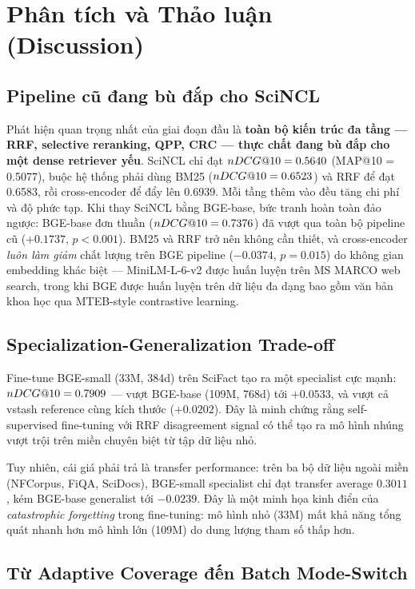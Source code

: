 \section{Phân tích và Thảo luận (Discussion)}
\label{sec:discussion}

\subsection{Pipeline cũ đang bù đắp cho SciNCL}

Phát hiện quan trọng nhất của giai đoạn đầu là \textbf{toàn bộ kiến trúc đa tầng --- RRF, selective
reranking, QPP, CRC --- thực chất đang bù đắp cho một dense retriever yếu}. SciNCL chỉ đạt $nDCG@10 = 0.5640$
(MAP@10 = 0.5077), buộc hệ thống phải dùng BM25 ($nDCG@10 = 0.6523$) và RRF để đạt 0.6583, rồi
cross-encoder để đẩy lên 0.6939. Mỗi tầng thêm vào đều tăng chi phí và độ phức tạp. Khi thay SciNCL bằng
BGE-base, bức tranh hoàn toàn đảo ngược: BGE-base đơn thuần ($nDCG@10 = 0.7376$) đã vượt qua toàn bộ
pipeline cũ ($+0.1737$, $p<0.001$). BM25 và RRF trở nên không cần thiết, và cross-encoder \emph{luôn
làm giảm} chất lượng trên BGE pipeline ($-0.0374$, $p=0.015$) do không gian embedding khác biệt ---
MiniLM-L-6-v2 được huấn luyện trên MS MARCO web search, trong khi BGE được huấn luyện trên dữ liệu
đa dạng bao gồm văn bản khoa học qua MTEB-style contrastive learning.

\subsection{Specialization-Generalization Trade-off}

Fine-tune BGE-small (33M, 384d) trên SciFact tạo ra một specialist cực mạnh: $nDCG@10 = 0.7909$ --- vượt
BGE-base (109M, 768d) tới $+0.0533$, và vượt cả vstash reference cùng kích thước ($+0.0202$). Đây là
minh chứng rằng self-supervised fine-tuning với RRF disagreement signal có thể tạo ra mô hình nhúng
vượt trội trên miền chuyên biệt từ tập dữ liệu nhỏ.

Tuy nhiên, cái giá phải trả là transfer performance: trên ba bộ dữ liệu ngoài miền (NFCorpus, FiQA,
SciDocs), BGE-small specialist chỉ đạt transfer average $0.3011$, kém BGE-base generalist tới $-0.0239$.
Đây là một minh họa kinh điển của \emph{catastrophic forgetting} trong fine-tuning: mô hình nhỏ (33M)
mất khả năng tổng quát nhanh hơn mô hình lớn (109M) do dung lượng tham số thấp hơn.

\subsection{Từ Adaptive Coverage đến Batch Mode-Switch}

